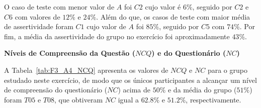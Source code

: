 O caso de teste com menor valor de $A$ foi $C2$ cujo valor é $6\%$, seguido por $C2$ e $C6$ com valores de $12\%$ e $24\%$.
Além do que, os casos de teste com maior média de assertividade foram $C1$ cujo valor de $A$ foi $85\%$, seguido por $C5$ com $74\%$. Por fim, a média da assertividade do grupo no exercício foi aproximadamente $43\%$.

\textbf{Níveis de Compreensão da Questão ($NCQ$) e do Questionário ($NC$)}

A Tabela~\ref{tab:F3_A4_NCQ} apresenta os valores de $NCQ$ e $NC$ para o grupo estudado neste exercício, de modo que os únicos participantes a alcançar um nível de compreensão do questionário ($NC$) acima de $50\%$ e da média do grupo ($51\%$) foram $T05$ e $T08$, que obtiveram $NC$ igual a $62.8\%$ e $51.2\%$, respectivamente. %

